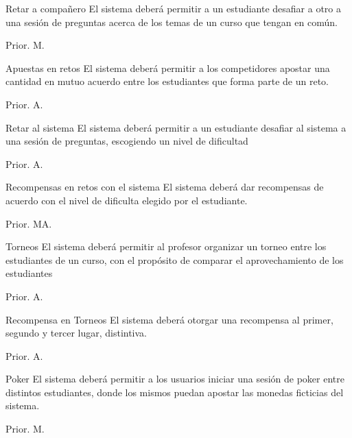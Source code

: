 \begin{RF}{Retar a compañero}{%
    El sistema deberá permitir a un estudiante desafiar a otro a una sesión de preguntas acerca de los temas de un curso que tengan en común. }
    \item[] Prior. M. %
\end{RF}

\begin{RF}{Apuestas en retos}{%
    El sistema deberá permitir a los competidores %
    apostar una cantidad en mutuo acuerdo entre los estudiantes que forma parte de un reto. }
    \item[] Prior. A. %
\end{RF}

\begin{RF}{Retar al sistema}{%
    El sistema deberá permitir a un estudiante desafiar al sistema a una sesión de preguntas, escogiendo un nivel de dificultad }
    \item[] Prior. A. %
\end{RF}

\begin{RF}{Recompensas en retos con el sistema}{%
    El sistema deberá dar recompensas de acuerdo con el nivel de dificulta elegido por el estudiante.}
    \item[] Prior. MA. %
\end{RF}

\begin{RF}{Torneos}{%
    El sistema deberá permitir al profesor organizar un torneo entre los estudiantes de un curso, con el propósito de comparar el aprovechamiento de los estudiantes}
    \item[] Prior. A. %
\end{RF}

\begin{RF}{Recompensa en Torneos}{%
    El sistema deberá otorgar una recompensa al primer, segundo y tercer lugar, distintiva. }
    \item[] Prior. A. %
\end{RF}

\begin{RF}{Poker}{%
    El sistema deberá permitir a los usuarios iniciar una sesión de poker entre distintos estudiantes, donde los mismos puedan apostar las monedas ficticias del sistema.}
    \item[] Prior. M. %
\end{RF}



